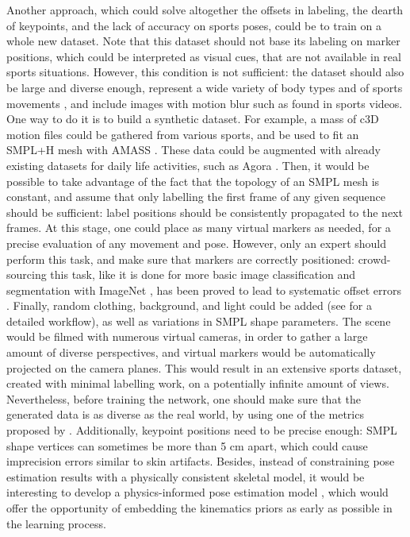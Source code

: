 Another approach, which could solve altogether the offsets in labeling, the dearth of keypoints, and the lack of accuracy on sports poses, could be to train on a whole new dataset. Note that this dataset should not base its labeling on marker positions, which could be interpreted as visual cues, that are not available in real sports situations. However, this condition is not sufficient: the dataset should also be large and diverse enough, represent a wide variety of body types and of sports movements \cite{Seethapathi2019}, and include images with motion blur such as found in sports videos. One way to do it is to build a synthetic dataset. For example, a mass of c3D motion files could be gathered from various sports, and be used to fit an SMPL+H mesh \cite{Pavlakos2019} with AMASS \cite{Mahmood2019}. These data could be augmented with already existing datasets for daily life activities, such as Agora \cite{Patel2021}. Then, it would be possible to take advantage of the fact that the topology of an SMPL mesh is constant, and assume that only labelling the first frame of any given sequence should be sufficient: label positions should be consistently propagated to the next frames. At this stage, one could place as many virtual markers as needed, for a precise evaluation of any movement and pose. However, only an expert should perform this task, and make sure that markers are correctly positioned: crowd-sourcing this task, like it is done for more basic image classification and segmentation with ImageNet \cite{Deng2009}, has been proved to lead to systematic offset errors \cite{Needham2021b}. Finally, random clothing, background, and light could be added (see \cite{Wood2021,Bolanos2021} for a detailed workflow), as well as variations in SMPL shape parameters. The scene would be filmed with numerous virtual cameras, in order to gather a large amount of diverse perspectives, and virtual markers would be automatically projected on the camera planes. This would result in an extensive sports dataset, created with minimal labelling work, on a potentially infinite amount of views. Nevertheless, before training the network, one should make sure that the generated data is as diverse as the real world, by using one of the metrics proposed by \cite{Borji2019, Borji2022}. Additionally, keypoint positions need to be precise enough: SMPL shape vertices can sometimes be more than 5 cm apart, which could cause imprecision errors similar to skin artifacts. Besides, instead of constraining pose estimation results with a physically consistent skeletal model, it would be interesting to develop a physics-informed pose estimation model \cite{Raissi2019}, which would offer the opportunity of embedding the kinematics priors as early as possible in the learning process.



